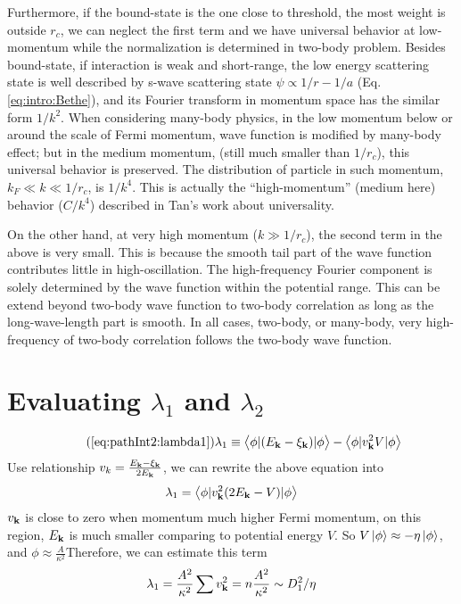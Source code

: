 Furthermore, if the bound-state is the one close to threshold, the most weight is outside $r_{c}$, we can neglect the first term and we have universal behavior at low-momentum while the normalization is determined in two-body problem.   Besides  bound-state, if interaction is weak and short-range, the low energy scattering state is well described by s-wave scattering state $\psi\propto1/r-1/a$ (Eq. \ref{eq:intro:Bethe}), and its Fourier transform in momentum space has the similar form $1/k^{2}$.  When considering many-body physics, in the low momentum below or around the scale of Fermi momentum,  wave function  is modified by many-body effect; but in the medium momentum, (still much smaller than $1/r_{c}$), this universal behavior is preserved.  The distribution of particle in such momentum, $k_{F}\ll{k}\ll{1/r_{c}}$, is $1/k^{4}$. This is actually the ``high-momentum'' (medium here) behavior ($C/k^{4}$) described in Tan's work about universality\cite{Tan2008-1,Tan2008-2}. 

On the other hand, at very high momentum ($k\gg1/r_{c}$), the second term in the above is very small.  This is because the smooth tail part of the wave function contributes little in high-oscillation.  The high-frequency Fourier component is solely determined by the wave function within the potential range.   This can be extend beyond two-body wave function to two-body correlation as long as the long-wave-length part is smooth.  In all cases, two-body, or many-body, very high-frequency of two-body correlation follows the two-body wave function.  





\section{Evaluating $\lambda_{1}$ and $\lambda_{2}$\label{sec:pathInt2:lambda}}
\begin{equation}\tag{\ref{eq:pathInt2:lambda1}}
\lambda_{1}\equiv\avs{\phi}{(E_{\vk}-\xi_{\vk})}{\phi}-\avs{\phi}{v_{\vk}^{2}V}{\phi}
\end{equation}
Use relationship $v_{k}=\frac{E_{\mathbf{k}}-\xi_{\mathbf{k}}}{2E_{\mathbf{k}}}$, we can rewrite the above equation into 
\begin{equation*}
\lambda_{1}=\bigl<{\phi{\lvert{v_{\ensuremath{\mathbf{k}}}^{2}(2E_{\ensuremath{\mathbf{k}}}-V)}\rvert}\phi}\bigr>
\end{equation*}
$v_{\mathbf{k}}$ is close to zero when momentum much higher Fermi momentum, on this region, $E_{\mathbf{k}}$ is much smaller comparing to potential energy $V$.  So $V\left|\phi\right>\approx-\eta\left|\phi\right>$, and $\phi\approx\frac{A}{\kappa^{2}}$Therefore, we can estimate this term 
\begin{equation}
\lambda_{1}=\frac{A^{2}}{\kappa^{2}}\sum{}v_{\mathbf{k}}^{2}=n\frac{A^{2}}{\kappa^{2}}\sim{}D_{1}^{2}/\eta
\end{equation}







